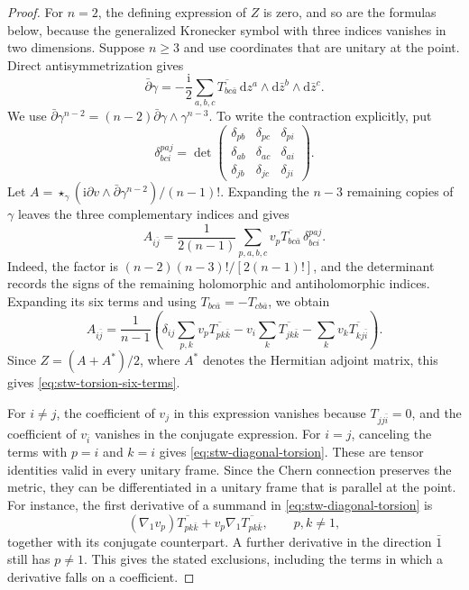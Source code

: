 \begin{proof}
For $n=2$, the defining expression of $Z$ is zero, and so are the formulas below, because the generalized Kronecker symbol with three indices vanishes in two dimensions. Suppose $n\geq3$ and use coordinates that are unitary at the point. Direct antisymmetrization gives
\[
 \bar\partial\gamma
   =-\frac{\mathrm i}{2}\sum_{a,b,c}
        \overline{T_{bc\bar a}}\,\mathrm{d}z^a\wedge \mathrm{d}\bar z^b\wedge \mathrm{d}\bar z^c.
\]
We use $\bar\partial\gamma^{n-2}=(n-2)\bar\partial\gamma\wedge\gamma^{n-3}$. To write the contraction explicitly, put
\[
 \delta^{paj}_{bci}
   =\det\begin{pmatrix}
     \delta_{pb}&\delta_{pc}&\delta_{pi}\\
     \delta_{ab}&\delta_{ac}&\delta_{ai}\\
     \delta_{jb}&\delta_{jc}&\delta_{ji}
   \end{pmatrix}.
\]
Let $A=\star_\gamma(\mathrm i\partial v\wedge\bar\partial\gamma^{n-2})/(n-1)!$. Expanding the $n-3$ remaining copies of $\gamma$ leaves the three complementary indices and gives
\[
 A_{i\bar j}=\frac1{2(n-1)}
    \sum_{p,a,b,c}v_p\overline{T_{bc\bar a}}\,
                         \delta^{paj}_{bci}.
\]
Indeed, the factor is $(n-2)(n-3)!/[2(n-1)!]$, and the determinant records the signs of the remaining holomorphic and antiholomorphic indices. Expanding its six terms and using $T_{bc\bar a}=-T_{cb\bar a}$, we obtain
\[
 A_{i\bar j}=\frac1{n-1}\left(
   \delta_{ij}\sum_{p,k}v_p\overline{T_{pk\bar k}}
   -v_i\sum_k\overline{T_{jk\bar k}}
   -\sum_kv_k\overline{T_{kj\bar i}}\right).
\]
Since $Z=(A+A^*)/2$, where $A^*$ denotes the Hermitian adjoint matrix, this gives \eqref{eq:stw-torsion-six-terms}.

For $i\ne j$, the coefficient of $v_j$ in this expression vanishes because $T_{jj\bar i}=0$, and the coefficient of $v_{\bar i}$ vanishes in the conjugate expression. For $i=j$, canceling the terms with $p=i$ and $k=i$ gives \eqref{eq:stw-diagonal-torsion}. These are tensor identities valid in every unitary frame. Since the Chern connection preserves the metric, they can be differentiated in a unitary frame that is parallel at the point. For instance, the first derivative of a summand in \eqref{eq:stw-diagonal-torsion} is
\[
 (\nabla_1v_p)\overline{T_{pk\bar k}}
       +v_p\nabla_1\overline{T_{pk\bar k}},\qquad p,k\ne1,
\]
together with its conjugate counterpart. A further derivative in the direction $\bar1$ still has $p\ne1$. This gives the stated exclusions, including the terms in which a derivative falls on a coefficient.
\end{proof}

